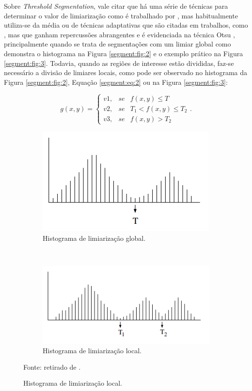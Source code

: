 Sobre \textit{Threshold Segmentation}, vale citar que há uma série de técnicas para determinar o valor de limiarização como é trabalhado por \cite{Al-amri2010}, mas habitualmente utiliza-se da média \cite{Al-amri2010, Yanowitz1989, Yuheng2017} ou de técnicas adaptativas que são citadas em trabalhos, como \cite{Yanowitz1989}, mas que ganham repercussões abrangentes e é evidenciada na técnica Otsu \cite{Otsu1979}, principalmente quando se trata de segmentações com um limiar global como demonstra o histograma na Figura \ref{segment:fig:2} e o exemplo prático na Figura  \ref{segment:fig:3}. Todavia, quando as regiões de interesse estão divididas, faz-se necessário a divisão de limiares locais, como pode ser observado no histograma da Figura \ref{segment:fig:2}, Equação \ref{segment:eq:2} ou na Figura \ref{segment:fig:3}:

\begin{equation}
\label{segment:eq:2}
    g(x,y) = \left\{\begin{matrix}
        v1, & se & f(x,y) \leq T \\ 
        v2, & se & T_1 < f(x,y) \leq T_2 \\
        v3, & se & f(x,y) > T_2
\end{matrix}\right..
\end{equation}

\begin{figure}[H]
   \caption{Histogramas de limiarizações.}
   \centering
   \label{segment:fig:2}
    \begin{subfigure}[t]{0.45\textwidth}
        \centering
        \includegraphics[width=0.5\linewidth]{recursos/imagens/image_seg/limi_glob.png}
        \caption{Histograma de limiarização global.}
        \label{segment:fig:2.1}
    \end{subfigure}%
    ~ 
    \begin{subfigure}[t]{0.45\textwidth}
        \centering
        \includegraphics[width=0.5\linewidth]{recursos/imagens/image_seg/limi_local.png}
        \caption{Histograma de limiarização local.}
        \label{segment:fig:2.2}
    \end{subfigure}%

    \vspace*{1 cm}
    Fonte: retirado de \cite{pedrini2008analise}.
\end{figure}

